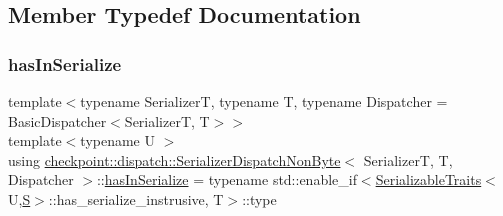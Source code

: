 \subsection{Member Typedef Documentation}
\mbox{\label{structcheckpoint_1_1dispatch_1_1_serializer_dispatch_non_byte_aee0190efdd8f0239a09883a9f59a4dd1}} 
\subsubsection{\texorpdfstring{has\+In\+Serialize}{hasInSerialize}}
{\footnotesize\ttfamily template$<$typename SerializerT, typename T, typename Dispatcher = Basic\+Dispatcher$<$\+Serializer\+T, T$>$$>$ \\
template$<$typename U $>$ \\
using \hyperlink{structcheckpoint_1_1dispatch_1_1_serializer_dispatch_non_byte}{checkpoint\+::dispatch\+::\+Serializer\+Dispatch\+Non\+Byte}$<$ SerializerT, T, Dispatcher $>$\+::\hyperlink{structcheckpoint_1_1dispatch_1_1_serializer_dispatch_non_byte_aee0190efdd8f0239a09883a9f59a4dd1}{has\+In\+Serialize} =  typename std\+::enable\+\_\+if$<$\hyperlink{structcheckpoint_1_1_serializable_traits}{Serializable\+Traits}$<$U,\hyperlink{structcheckpoint_1_1dispatch_1_1_serializer_dispatch_non_byte_a456d0c02fc35667989d79ddbb0393776}{S}$>$\+::has\+\_\+serialize\+\_\+instrusive, T$>$\+::type}

\mbox{\label{structcheckpoint_1_1dispatch_1_1_serializer_dispatch_non_byte_aee9d815f18b48855fefbecbbbf60436b}} 
